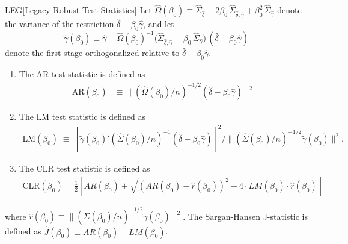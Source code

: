 \begin{definitionp}{LEG}[Legacy Robust Test Statistics]
Let \(\hat\Omega(\beta_0) \equiv \hat\Sigma_{\hat\delta} - 2\beta_0\,\hat\Sigma_{\hat\delta,\hat\gamma} + \beta_0^2\,\hat\Sigma_{\hat\gamma}\) denote the variance of the restriction \(\hat \delta - \beta_0 \hat \gamma\), and let
\[\tilde\gamma(\beta_0) \equiv \hat\gamma - \hat\Omega(\beta_0) ^{-1}\bigl(\hat\Sigma_{\hat\delta,\hat\gamma} - \beta_0\,\hat\Sigma_{\hat\gamma}\bigr)\,(\hat\delta - \beta_0\hat\gamma)\] denote the first stage orthogonalized relative to \(\hat \delta - \beta_0 \hat \gamma\).
    \begin{enumerate}
        \item 
        The AR test statistic is defined as
        \begin{align}
        \mathrm{AR}(\beta_0) &\equiv \bigl\lVert (\hat\Omega(\beta_0)/n)^{-1/2}(\hat\delta - \beta_0\hat\gamma)\bigr\rVert^2
        \end{align}
        \item 
        The LM test statistic is defined as
        \begin{align}
        \mathrm{LM}(\beta_0) \;\equiv\; {\left[\tilde\gamma(\beta_0)'(\hat\Sigma(\beta_0)/n)^{-1}(\hat\delta - \beta_0\hat\gamma)\right]^2}\bigg/{\bigl\lVert(\hat\Sigma(\beta_0)/n)^{-1/2}\tilde\gamma(\beta_0)\bigr\rVert^2}.
        \end{align}
        \item 
        The CLR test statistic is defined as
        \begin{align}
        \mathrm{CLR}(\beta_0) = \frac{1}{2}\left[AR(\beta_0) + \sqrt{(AR(\beta_0)-\hat r(\beta_0))^2 + 4 \cdot LM(\beta_0) \cdot \hat r(\beta_0)} \right] 
    \end{align}
    \end{enumerate}
    \noindent 
     where \(\hat r(\beta_0) \equiv \bigl\lVert(\hat\Sigma(\beta_0)/n)^{-1/2}\tilde\gamma(\beta_0)\bigr\rVert^2\). The Sargan-Hansen J-statistic is defined as \(\hat J(\beta_0)\equiv AR(\beta_0)- LM(\beta_0)\).
\end{definitionp}
